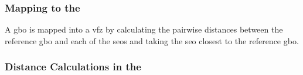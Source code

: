 \documentclass[final,twocolumn,12pt]{elsarticle}
\begin{document}
%	
%	
	\subsubsection{Mapping  to the }
	\label{sec:methods:framework:proj}
	
	A \gls{gbo} is mapped into a \gls{vfz} by calculating the pairwise distances between the reference \gls{gbo} and each of the \glspl{seo} and taking the \gls{seo} closest to the reference \gls{gbo}.
	
	\subsubsection{Distance Calculations in the }
	\label{sec:methods:framework:vfz-dist}
	
\end{document}
